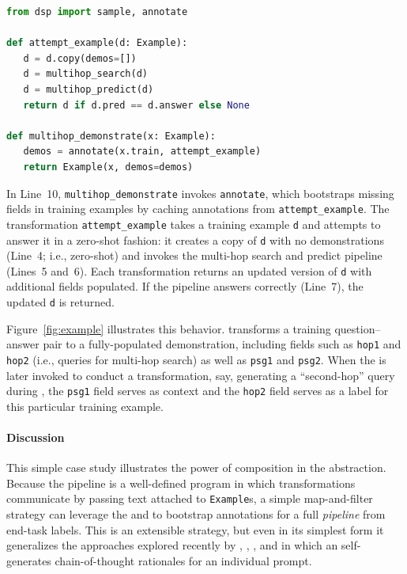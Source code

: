\begin{samepage}
\begin{lstlisting}[language=Python,breaklines=true]
from dsp import sample, annotate

def attempt_example(d: Example):
   d = d.copy(demos=[])
   d = multihop_search(d)
   d = multihop_predict(d)
   return d if d.pred == d.answer else None

def multihop_demonstrate(x: Example):
   demos = annotate(x.train, attempt_example)
   return Example(x, demos=demos)
\end{lstlisting}
\end{samepage}

In Line~10, \texttt{multihop\_demonstrate} invokes \texttt{annotate}, which bootstraps missing fields in training examples by caching annotations from \texttt{attempt\_example}. The transformation \texttt{attempt\_example} takes a training example \texttt{d} and attempts to answer it in a zero-shot fashion: it creates a copy of \texttt{d} with no demonstrations (Line~4; i.e., zero-shot) and invokes the multi-hop search and predict pipeline (Lines~5 and~6). Each transformation returns an updated version of \texttt{d} with additional fields populated. If the pipeline answers correctly (Line~7), the updated \texttt{d} is returned.

Figure~\ref{fig:example} illustrates this behavior. \demonstrate transforms a training question--answer pair to a fully-populated demonstration, including fields such as \texttt{hop1} and \texttt{hop2} (i.e., queries for multi-hop search) as well as \texttt{psg1} and \texttt{psg2}. When the \LM{} is later invoked to conduct a transformation, say, generating a ``second-hop'' query during \search, the \texttt{psg1} field serves as context and the \texttt{hop2} field serves as a label for this particular training example.


\vspace{-2mm}
\paragraph{Discussion}

This simple case study illustrates the power of composition in the \DSP abstraction. Because the pipeline is a well-defined program in which transformations communicate by passing text attached to \texttt{Example}s, a simple map-and-filter strategy can leverage the \LM{} and \RM{} to bootstrap annotations for a full \textit{pipeline} from end-task labels. This is an extensible strategy, but even in its simplest form it generalizes the approaches explored recently by \citet{zelikman2022star}, \citet{wei2022chain}, \citet{zhang2022automatic}, and \citet{huang2022large} in which an \LM{} self-generates chain-of-thought rationales for an individual prompt.


